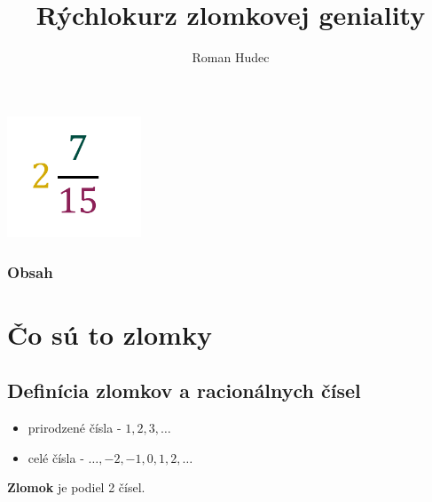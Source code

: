\documentclass{beamer}
\title{\textbf{Rýchlokurz zlomkovej geniality\\}}
\date{}
\author{Roman Hudec}
\institute{Educat - vzdelávacie centrum}
\begin{document}
	
	\begin{frame}
		\titlepage
		
		\begin{center}
			\includegraphics[width=4cm]{zlomok.png}
		\end{center}
		
	\end{frame}
	
	\begin{frame}
		\frametitle{Obsah}
		\tableofcontents
	\end{frame}
	
	
	\section{Čo sú to zlomky}
	
	\subsection{Definícia zlomkov a racionálnych čísel}
	
	\begin{frame}
		\begin{itemize}
			\frametitle{Zlomky}
			\item prirodzené čísla - $1, 2, 3, \dots$
			\item celé čísla - $\dots, -2, -1, 0, 1, 2, \dots$
		\end{itemize}
		
		\begin{definition}
			\textbf{Zlomok} je podiel 2 čísel.
		\end{definition}
	\end{frame}
\end{document}
